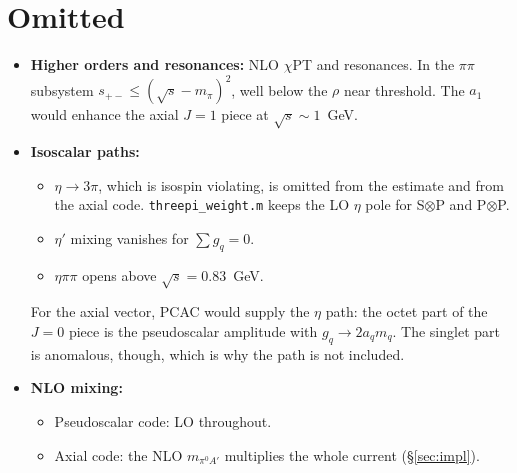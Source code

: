 \documentclass{article}
\newcommand{\spm}{s_{+-}}
\newcommand{\mpi}{m_\pi}
\begin{document}
\section{Omitted}

\begin{itemize}
\item \textbf{Higher orders and resonances:} NLO $\chi$PT and resonances. In the $\pi\pi$ subsystem
  $\spm\le(\sqrt s-\mpi)^2$, well below the $\rho$ near threshold. The $a_1$ would enhance the
  axial $J=1$ piece at $\sqrt s\sim1$~GeV.
\item \textbf{Isoscalar paths:}
  \begin{itemize}
  \item $\eta\to3\pi$, which is isospin violating, is omitted from the estimate and from the axial
    code. \texttt{threepi\_weight.m} keeps the LO $\eta$ pole for S$\otimes$P and P$\otimes$P.
  \item $\eta'$ mixing vanishes for $\sum g_q=0$.
  \item $\eta\pi\pi$ opens above $\sqrt s=0.83$~GeV.
  \end{itemize}
  For the axial vector, PCAC would supply the $\eta$ path: the octet part of the $J=0$ piece is
  the pseudoscalar amplitude with $g_q\to2a_qm_q$. The singlet part is anomalous, though, which is
  why the path is not included.
\item \textbf{NLO mixing:}
  \begin{itemize}
  \item Pseudoscalar code: LO throughout.
  \item Axial code: the NLO $m_{\pi^0A'}$ multiplies the whole current (\S\ref{sec:impl}).
  \end{itemize}
\end{itemize}
\end{document}

